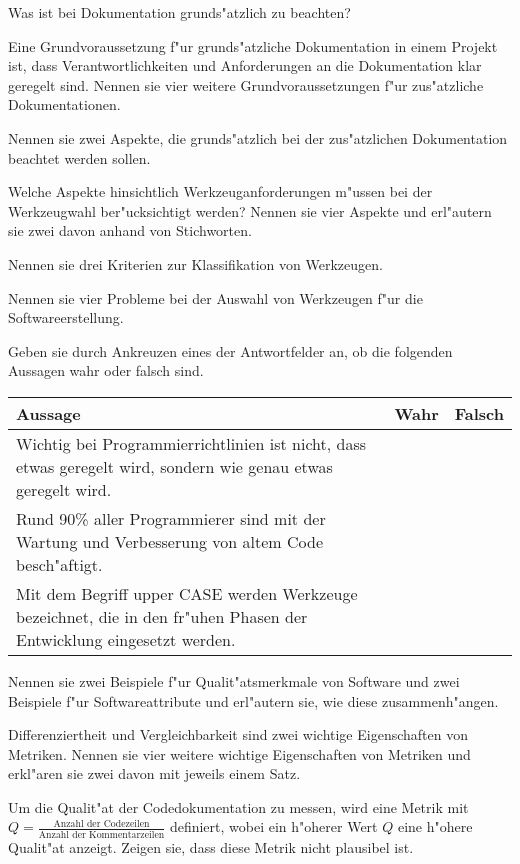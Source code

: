 \documentclass[12pt]{exam}
\begin{document}
\begin{questions}
\question[2] Was ist bei Dokumentation grunds"atzlich zu beachten?
\addpoints

\question[2] Eine Grundvoraussetzung f"ur grunds"atzliche Dokumentation in einem Projekt ist, dass Verantwortlichkeiten und Anforderungen an die Dokumentation klar geregelt sind. Nennen sie vier weitere Grundvoraussetzungen f"ur zus"atzliche Dokumentationen.
\addpoints

\question[2] Nennen sie zwei Aspekte, die grunds"atzlich bei der zus"atzlichen Dokumentation beachtet werden sollen.
\addpoints

\question[3] Welche Aspekte hinsichtlich Werkzeuganforderungen m"ussen bei der Werkzeugwahl ber"ucksichtigt werden? Nennen sie vier Aspekte und erl"autern sie zwei davon anhand von Stichworten.
\addpoints

\question[3] Nennen sie drei Kriterien zur Klassifikation von Werkzeugen.
\addpoints

\question[4] Nennen sie vier Probleme bei der Auswahl von Werkzeugen f"ur die Softwareerstellung.
\addpoints

\question[3] Geben sie durch Ankreuzen eines der Antwortfelder an, ob die folgenden Aussagen wahr oder falsch sind. \\
\addpoints
\begin{tabular}{| p{12cm} | l | l |} \hline
    Aussage & Wahr & Falsch \\ \hline
    Wichtig bei Programmierrichtlinien ist nicht, dass etwas geregelt wird, sondern wie genau etwas geregelt wird. & & \\ \hline
    Rund 90\% aller Programmierer sind mit der Wartung und Verbesserung von altem Code besch"aftigt. & & \\ \hline
    Mit dem Begriff upper CASE werden Werkzeuge bezeichnet, die in den fr"uhen Phasen der Entwicklung eingesetzt werden. & & \\ \hline
\end{tabular}

\question[6] Nennen sie zwei Beispiele f"ur Qualit"atsmerkmale von Software und zwei Beispiele f"ur Softwareattribute und erl"autern sie, wie diese zusammenh"angen.
\addpoints

\question[4] Differenziertheit und Vergleichbarkeit sind zwei wichtige Eigenschaften von Metriken. Nennen sie vier weitere wichtige Eigenschaften von Metriken und erkl"aren sie zwei davon mit jeweils einem Satz.
\addpoints

\question[4] Um die Qualit"at der Codedokumentation zu messen, wird eine Metrik mit $Q = \frac{\text{Anzahl der Codezeilen}}{\text{Anzahl der Kommentarzeilen}}$ definiert, wobei ein h"oherer Wert $Q$ eine h"ohere Qualit"at anzeigt. Zeigen sie, dass diese Metrik nicht plausibel ist.
\addpoints


\end{questions}
\end{document}

